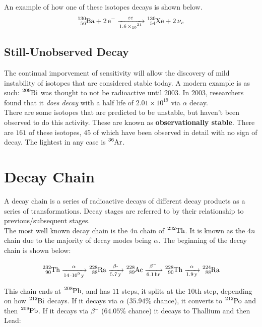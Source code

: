 \documentclass{article}
\begin{document}
\begin{multicols*}{2}
    An example of how one of these isotopes decays is shown below.
    \[
      \ce{^{130}_{56}Ba + 2 e- ->[\varepsilon\varepsilon][1.6 \times 10^{21}] ^{130}_{54}Xe + 2 \nu_{e}}
    \]

    \subsection{Still-Unobserved Decay}
    The continual imporvement of sensitivity will allow the discovery of mild
    instability of isotopes that are considered stable today. A modern example is as
    such: $\ce{^{209}Bi}$ was thought to not be radioactive until $2003$. In $2003$,
    researchers found that it \textit{does decay} with a half life of $2.01 \times 10^{19}$
    via $\alpha$ decay.\\

    There are some isotopes that are predicted to be unstable, but haven't been observed
    to do this activity. These are known as \textbf{observationally stable}. There are
    $161$ of these isotopes, $45$ of which have been observed in detail with no sign of
    decay. The lightest in any case is $\ce{^{36}Ar}$.

    \section{Decay Chain}
    A decay chain is a series of radioactive decays of different decay products
    as a series of transformations. Decay stages are referred to by their relationship
    to previous/subsequent stages.\\

    The most well known decay chain is the $4n$ chain of $\ce{^{232}Th}$. It is known
    as the $4n$ chain due to the majority of decay modes being $\alpha$. The beginning
    of the decay chain is shown below:

    \begin{equation*}
      \begin{split}
        \ce{^{232}_{90}Th ->[\alpha][14\cdot{10^{9}} y] ^{228}_{88}Ra
          ->[\beta{-}][5.7 y] ^{228}_{89}Ac ->[\beta-][6.1 hr] ^{228}_{90}Th
          ->[\alpha][1.9 y] ^{224}_{88}Ra}
      \end{split}
    \end{equation*}

    This chain ends at $\ce{^{208}Pb}$, and has $11$ steps, it splits at the
    10th step, depending
    on how $\ce{^{212}Bi}$ decays. If it decays via $\alpha$ ($35.94\%$ chance),
    it converts to $\ce{^{212}Po}$ and then $\ce{^{208}Pb}$. If it decays via
    $\beta{^{-}}$ ($64.05\%$ chance) it decays to Thallium and then Lead:


\end{multicols*}
\end{document}

